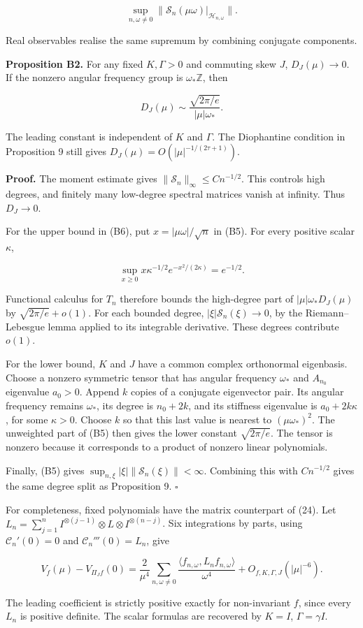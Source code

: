 \documentclass[
  british,
  11pt,
  a4paper,
]{article}
\begin{document}
\[
\sup_{n,\omega\ne0}\bigl\|\mathcal S_n(\mu\omega)|_{\mathcal H_{n,\omega}}\bigr\|.
\]

Real observables realise the same supremum by combining conjugate
components.

\textbf{Proposition B2.} For any fixed \(K,\Gamma>0\) and commuting skew
\(J\), \(D_J(\mu)\to0\). If the nonzero angular frequency group is
\(\omega_*\mathbb Z\), then

\[
D_J(\mu)\sim\frac{\sqrt{2\pi/e}}{|\mu|\omega_*}. \tag{B6}
\]

The leading constant is independent of \(K\) and \(\Gamma\). The
Diophantine condition in Proposition 9 still gives
\(D_J(\mu)=O(|\mu|^{-1/(2\tau+1)})\).

\textbf{Proof.} The moment estimate gives
\(\|\mathcal S_n\|_\infty\le Cn^{-1/2}\). This controls high degrees,
and finitely many low-degree spectral matrices vanish at infinity. Thus
\(D_J\to0\).

For the upper bound in (B6), put \(x=|\mu\omega|/\sqrt n\) in (B5). For
every positive scalar \(\kappa\),

\[
\sup_{x\ge0}x\kappa^{-1/2}e^{-x^2/(2\kappa)}=e^{-1/2}.
\]

Functional calculus for \(T_n\) therefore bounds the high-degree part of
\(|\mu|\omega_*D_J(\mu)\) by \(\sqrt{2\pi/e}+o(1)\). For each bounded
degree, \(|\xi|\mathcal S_n(\xi)\to0\), by the Riemann--Lebesgue lemma
applied to its integrable derivative. These degrees contribute \(o(1)\).

For the lower bound, \(K\) and \(J\) have a common complex orthonormal
eigenbasis. Choose a nonzero symmetric tensor that has angular frequency
\(\omega_*\) and \(A_{n_0}\) eigenvalue \(a_0>0\). Append \(k\) copies
of a conjugate eigenvector pair. Its angular frequency remains
\(\omega_*\), its degree is \(n_0+2k\), and its stiffness eigenvalue is
\(a_0+2k\kappa\), for some \(\kappa>0\). Choose \(k\) so that this last
value is nearest to \((\mu\omega_*)^2\). The unweighted part of (B5)
then gives the lower constant \(\sqrt{2\pi/e}\). The tensor is nonzero
because it corresponds to a product of nonzero linear polynomials.

Finally, (B5) gives \(\sup_{n,\xi}|\xi|\|\mathcal S_n(\xi)\|<\infty\).
Combining this with \(Cn^{-1/2}\) gives the same degree split as
Proposition 9. \(\square\)

For completeness, fixed polynomials have the matrix counterpart of (24).
Let
\(L_n=\sum_{j=1}^n I^{\otimes(j-1)}\otimes L\otimes I^{\otimes(n-j)}\).
Six integrations by parts, using \(\mathcal C_n'(0)=0\) and
\(\mathcal C_n'''(0)=L_n\), give

\[
V_f(\mu)-V_{\Pi_Jf}(0)
=\frac2{\mu^4}\sum_{n,\omega\ne0}
\frac{\langle f_{n,\omega},L_nf_{n,\omega}\rangle}{\omega^4}
+O_{f,K,\Gamma,J}(|\mu|^{-6}). \tag{B7}
\]

The leading coefficient is strictly positive exactly for non-invariant
\(f\), since every \(L_n\) is positive definite. The scalar formulas are
recovered by \(K=I\), \(\Gamma=\gamma I\).
\end{document}
